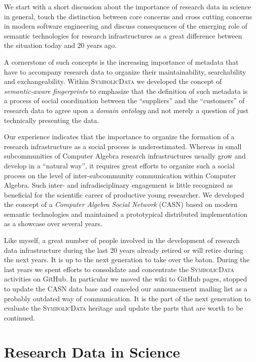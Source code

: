 \documentclass[a4paper,11pt]{article}
\def\SD{\textsc{SymbolicData}}
\begin{document}
We start with a short discussion about the importance of research data in
science in general, touch the distinction between core concerns and cross
cutting concerns in modern software engineering and discuss consequences of the
emerging role of semantic technologies for research infrastructures as a great
difference between the situation today and 20 years ago.

A cornerstone of such concepts is the increasing importance of metadata that
have to accompany research data to organize their maintainability,
searchability and exchangeability. Within {\SD} we developed the concept of
\emph{semantic-aware fingerprints} to emphasize that the definition of such
metadata is a process of social coordination between the ``suppliers'' and the
``customers'' of research data to agree upon a \emph{domain ontology} and not
merely a question of just technically presenting the data.

Our experience indicates that the importance to organize the formation of a
research infrastructure as a social process is underestimated.  Whereas in
small subcommunities of Computer Algebra research infrastructures usually grow
and develop in a ``natural way'', it requires great efforts to organize such a
social process on the level of inter-subcommunity communication within Computer
Algebra.  Such inter- and infradisciplinary engagement is little recognized as
beneficial for the scientific career of productive young researcher. We
developed the concept of a \emph{Computer Algebra Social Network} (CASN)
\cite{car-55} based on modern semantic technologies and maintained a
prototypical distributed implementation as a showcase over several years.

Like myself, a great number of people involved in the development of research
data infrastructure during the last 20 years already retired or will retire
during the next years.  It is up to the next generation to take over the baton.
During the last years we spent efforts to consolidate and concentrate the {\SD}
activities on GitHub. In particular we moved the wiki to GitHub pages, stopped
to update the CASN data base and canceled our announcement mailing list as a
probably outdated way of communication.  It is the part of the next generation
to evaluate the {\SD} heritage and update the parts that are worth to be
continued.

\section{Research Data in Science}
\end{document}
